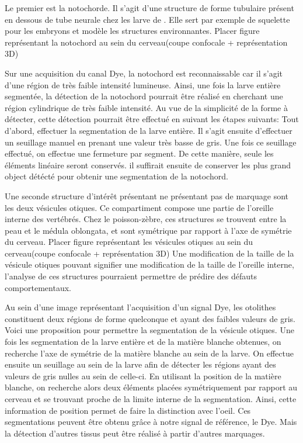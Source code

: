 \documentclass[\main/main.tex]{subfiles}
\begin{document}
%
Le premier est la notochorde.
%
Il s'agit d'une structure de forme tubulaire présent en dessous de tube neurale chez les larve de \pz{}.
%
Elle sert par exemple de squelette pour les embryons et modèle les structures environnantes.
\color{magenta}
Placer figure représentant la notochord au sein du cerveau(coupe confocale + représentation 3D)
\color{black}

%
Sur une acquisition du canal Dye, la notochord est reconnaissable car il s'agit d'une région de très faible intensité lumineuse.
%
Ainsi, une fois la larve entière segmentée,
la détection de la notochord pourrait être réalisé en cherchant une région cylindrique de très faible intensité.
%
Au vue de la simplicité de la forme à détecter, cette détection pourrait être effectué en suivant les étapes suivants:
%
Tout d'abord, effectuer la segmentation de la larve entière.
%
Il s'agit ensuite d'effectuer un seuillage manuel en prenant une valeur très basse de gris.
%
Une fois ce seuillage effectué, on effectue une fermeture par segment.
%
De cette manière, seule les éléments linéaire seront conservés.
%
il suffirait ensuite de conserver les plus grand object détécté pour obtenir une segmentation de la notochord.

%
Une seconde structure d'intérêt présentant ne présentant pas de marquage sont les deux vésicules otiques.
%
Ce compartiment compose une partie de l'oreille interne des vertébrés.
%
Chez le poisson-zèbre, ces structures se trouvent entre la peau et le médula oblongata,
et sont symétrique par rapport à l'axe de symétrie du cerveau.
\color{magenta}
Placer figure représentant les vésicules otiques au sein du cerveau(coupe confocale + représentation 3D)
\color{black}
%
Une modification de la taille de la vésicule otiques pouvant signifier une modification de la taille de l'oreille interne,
l'analyse de ces structures pourraient permettre de prédire des défauts comportementaux\cite{Whitfield_1996}.

%
Au sein d'une image représentant l'acquisition d'un signal Dye,
les otolithes constituent deux régions de forme quelconque et ayant des faibles valeurs de gris.
%
Voici une proposition pour permettre la segmentation de la vésicule otiques.
%
Une fois les segmentation de la larve entière et de la matière blanche obtenues, on recherche l'axe de symétrie de la matière blanche au sein de la larve.
%
On effectue ensuite un seuillage au sein de la larve afin de détecter les régions ayant des valeurs de gris nulles au sein de celle-ci.
%
En utilisant la position de la matière blanche, on recherche alors deux éléments placées symétriquement par rapport au cerveau et se trouvant proche de la limite interne de la segmentation.
%
Ainsi, cette information de position permet de faire la distinction avec l'oeil.
%
Ces segmentations peuvent être obtenu grâce à notre signal de référence, le Dye.
%
Mais la détection d'autres tissus peut être réalisé à partir d'autres marquages.
\end{document}
